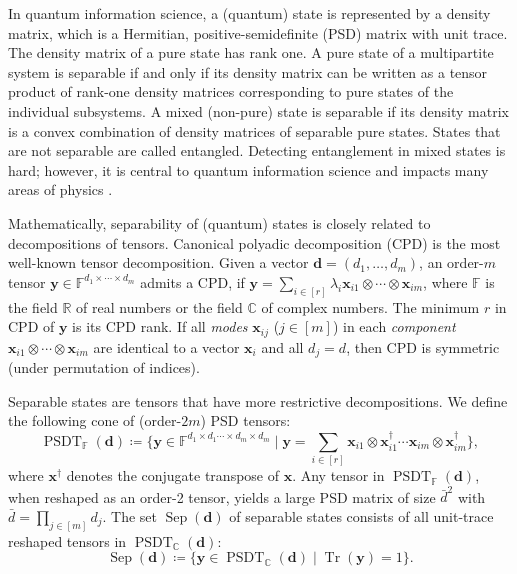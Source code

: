 \documentclass[smallextended]{svjour3}
\newcommand{\R}{\mathbb R}
\newcommand{\F}{\mathbb F}
\newcommand{\C}{\mathbb C}
\DeclareMathOperator{\sep}{Sep}
\DeclareMathOperator{\SOST}{PSDT}
\newcommand{\1}{\mathbf{1}}
\newcommand{\x}{\mathbf{x}}
\newcommand{\y}{\mathbf{y}}
\DeclareMathOperator{\tr}{Tr}
\DeclareMathOperator{\mtens}{\otimes}
\newcommand{\vc}[1]{\mathbf{#1}}
\newcommand{\vd}{\vc{d}}
\newcommand{\deq}{\coloneqq}
\begin{document}
In quantum information science, a (quantum) state is represented by a density matrix, which is a Hermitian, positive-semidefinite (PSD) matrix with unit trace. The density matrix of a pure state has rank one. A pure state of a multipartite system is separable if and only if its density matrix can be written as a tensor product of rank-one density matrices corresponding to pure states of the individual subsystems.  A mixed (non-pure) state is separable if its density matrix is a convex combination of density matrices of separable pure states. States that are not separable are called entangled. Detecting entanglement in mixed states is hard; however, it is central to quantum information science and impacts many areas of physics \cite{Eisert2010colloqium,Nishioka2018Entanlgement}.

Mathematically, separability of (quantum) states is closely related to decompositions of tensors. Canonical polyadic decomposition (CPD) is the most well-known tensor decomposition. Given a vector \( \vd = (d_1, \dots, d_m) \), an order-$m$ tensor $\y \in \F^{d_1 \times \cdots \times d_m}$ admits  a CPD, if $\y =  \sum_{i \in [r]} \lambda_i \x_{i1} \mtens \cdots \mtens \x_{im}$,
where $\F$ is the field $\R$ of real numbers or the field $\C$ of complex numbers. The minimum $r$ in CPD of $\y$ is its CPD rank.
If all \textit{modes} $\x_{ij}$ ($j \in [m]$) in each \textit{component} $\x_{i1} \mtens  \cdots  \mtens \x_{im}$  are identical to a vector $\x_{i}$ and all $d_j = d$, then CPD is symmetric (under permutation of indices).

Separable states are tensors that have more restrictive decompositions.  We define the following cone of (order-$2m$) PSD  tensors:
\begin{equation}
    \label{eq.psdt}
    \SOST_{\F}(\vd) \deq \{ \y \in \F^{d_1 \times d_1 \cdots \times d_m \times d_m} \mid \y = \sum_{i \in [r]}  \x_{i1} \mtens \x_{i1}^\dagger \cdots \x_{im} \mtens \x_{im}^\dagger  \},
\end{equation}
where $\x^\dagger$ denotes the conjugate transpose of $\x$.
Any tensor in $\SOST_{\F}(\vd)$, when reshaped as an order-2 tensor, yields a large PSD matrix of size $\bar{d}^2$ with $\bar{d} = \prod_{j \in [m]}d_j$. The set  $\sep(\vd)$ of separable states consists of  all   unit-trace reshaped  tensors in $\SOST_{\C}(\vd)$:
\begin{equation}
    \label{eq.sepstate}
    \sep(\vd) \deq \{ \y \in \SOST_{\C}(\vd)  \mid \tr(\y) = 1 \}.
\end{equation}
\end{document}

